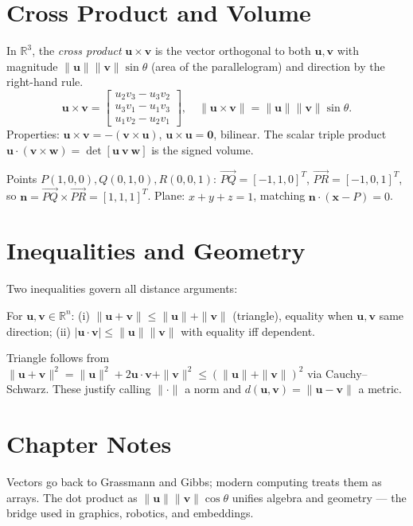 \section{Cross Product and Volume}
\label{sec:cross}
In $\mathbb{R}^3$, the \emph{cross product} $\mathbf{u}\times\mathbf{v}$ is the vector orthogonal to both $\mathbf{u},\mathbf{v}$ with magnitude $\|\mathbf{u}\|\|\mathbf{v}\|\sin\theta$ (area of the parallelogram) and direction by the right-hand rule.
\[
  \mathbf{u}\times\mathbf{v}=\begin{bmatrix}u_2v_3-u_3v_2\\u_3v_1-u_1v_3\\u_1v_2-u_2v_1\end{bmatrix},\quad
  \|\mathbf{u}\times\mathbf{v}\|=\|\mathbf{u}\|\|\mathbf{v}\|\sin\theta.
\]
Properties: $\mathbf{u}\times\mathbf{v}=-(\mathbf{v}\times\mathbf{u})$, $\mathbf{u}\times\mathbf{u}=\mathbf{0}$, bilinear. The scalar triple product $\mathbf{u}\cdot(\mathbf{v}\times\mathbf{w})=\det[\mathbf{u}\ \mathbf{v}\ \mathbf{w}]$ is the signed volume.

\begin{example}
Points $P(1,0,0),Q(0,1,0),R(0,0,1)$: $\overrightarrow{PQ}=[-1,1,0]^T$, $\overrightarrow{PR}=[-1,0,1]^T$, so $\mathbf{n}=\overrightarrow{PQ}\times\overrightarrow{PR}=[1,1,1]^T$. Plane: $x+y+z=1$, matching $\mathbf{n}\cdot(\mathbf{x}-P)=0$.
\end{example}

\section{Inequalities and Geometry}
\label{sec:inequalities}
Two inequalities govern all distance arguments:
\begin{theorem}
For $\mathbf{u},\mathbf{v}\in\mathbb{R}^n$: (i) $\|\mathbf{u}+\mathbf{v}\|\le\|\mathbf{u}\|+\|\mathbf{v}\|$ (triangle), equality when $\mathbf{u},\mathbf{v}$ same direction; (ii) $|\mathbf{u}\cdot\mathbf{v}|\le\|\mathbf{u}\|\|\mathbf{v}\|$ with equality iff dependent.
\end{theorem}
Triangle follows from $\|\mathbf{u}+\mathbf{v}\|^2=\|\mathbf{u}\|^2+2\mathbf{u}\cdot\mathbf{v}+\|\mathbf{v}\|^2\le(\|\mathbf{u}\|+\|\mathbf{v}\|)^2$ via Cauchy--Schwarz. These justify calling $\|\cdot\|$ a norm and $d(\mathbf{u},\mathbf{v})=\|\mathbf{u}-\mathbf{v}\|$ a metric.


\section{Chapter Notes}
Vectors go back to Grassmann and Gibbs; modern computing treats them as arrays. The dot product as $\|\mathbf{u}\|\|\mathbf{v}\|\cos\theta$ unifies algebra and geometry --- the bridge used in graphics, robotics, and embeddings.

